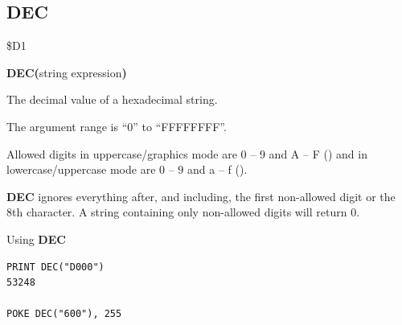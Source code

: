 \subsection{DEC}
\begin{description}[leftmargin=2cm,style=nextline]
\item [Token:]    \$D1

\item [Format:]   {\bf DEC(}string expression{\bf)}

\item [Returns:]  The decimal value of a hexadecimal string.

                  The argument range is ``0'' to ``FFFFFFFF''.

\item [Remarks:]  Allowed digits in uppercase/graphics mode are 0 -- 9 and A -- F () and in lowercase/uppercase mode are 0 -- 9 and a -- f ().

                  {\bf DEC} ignores everything after, and including, the first non-allowed digit or the 8th character. A string containing only non-allowed digits will return 0.

\item [Examples:] Using {\bf DEC}

\begin{tcolorbox}[colback=black,coltext=white]
\verbatimfont{\codefont}
\begin{verbatim}
PRINT DEC("D000")
53248

POKE DEC("600"), 255
\end{verbatim}
\end{tcolorbox}
\end{description}


\newpage
